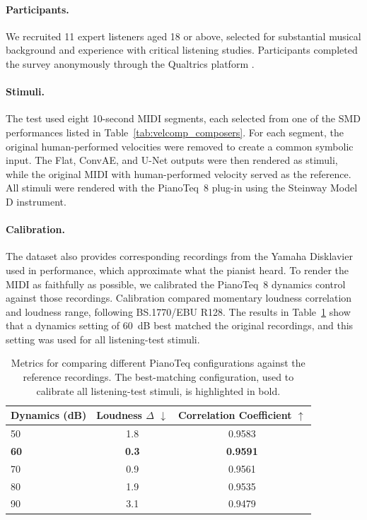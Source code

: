 \paragraph{Participants.}
We recruited 11 expert listeners aged 18 or above, selected for substantial musical background and experience with critical listening studies.
Participants completed the survey anonymously through the Qualtrics platform \cite{qualtrics}.

\paragraph{Stimuli.}
The test used eight 10-second MIDI segments, each selected from one of the SMD performances listed in Table~\ref{tab:velcomp_composers}.
For each segment, the original human-performed velocities were removed to create a common symbolic input.
The Flat, ConvAE, and U-Net outputs were then rendered as stimuli, while the original MIDI with human-performed velocity served as the reference.
All stimuli were rendered with the PianoTeq~8 plug-in using the Steinway Model D instrument.

\paragraph{Calibration.}
The dataset also provides corresponding recordings from the Yamaha Disklavier used in performance, which approximate what the pianist heard.
To render the MIDI as faithfully as possible, we calibrated the PianoTeq~8 dynamics control against those recordings.
Calibration compared momentary loudness correlation and loudness range, following BS.1770/EBU R128.
The results in Table~\ref{tab:velcomp_pianoteq} show that a dynamics setting of 60~dB best matched the original recordings, and this setting was used for all listening-test stimuli.

\begin{table}[h]
\centering
\setlength{\tabcolsep}{7pt}          %
\fontsize{11pt}{14pt}\selectfont     %
\renewcommand{\arraystretch}{1.2}    %
\caption{Metrics for comparing different PianoTeq configurations against the reference recordings. The best-matching configuration, used to calibrate all listening-test stimuli, is highlighted in bold.}
\label{tab:velcomp_pianoteq}
\begin{tabular}{|l|c|c|}
\hline
\textbf{Dynamics (dB)} & \textbf{Loudness $\Delta$ \(\downarrow\)} & \textbf{Correlation Coefficient \(\uparrow\)} \\
\hline
50 & 1.8 & 0.9583 \\
\hline
\textbf{60} & \textbf{0.3} & \textbf{0.9591} \\
\hline
70 & 0.9 & 0.9561 \\
\hline
80 & 1.9 & 0.9535 \\
\hline
90 & 3.1 & 0.9479 \\
\hline
\end{tabular}
\end{table}

